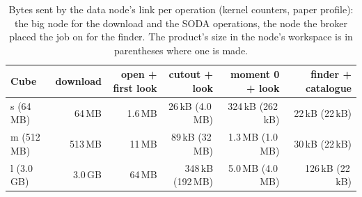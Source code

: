 \begin{table}
\centering
\caption{Bytes sent by the data node's link per operation (kernel counters, paper profile): the big node for the download and the SODA operations, the node the broker placed the job on for the finder. The product's size in the node's workspace is in parentheses where one is made.}
\label{tab:bytes-measured}
\small
\begin{tabular*}{\linewidth}{@{\extracolsep{\fill}}lrrrrr}
\toprule
Cube & download & open + first look & cutout + look & moment 0 + look & finder + catalogue \\
\midrule
s (64\,MB) & 64\,MB & 1.6\,MB & 26\,kB (4.0\,MB) & 324\,kB (262\,kB) & 22\,kB (22\,kB) \\
m (512\,MB) & 513\,MB & 11\,MB & 89\,kB (32\,MB) & 1.3\,MB (1.0\,MB) & 30\,kB (22\,kB) \\
l (3.0\,GB) & 3.0\,GB & 64\,MB & 348\,kB (192\,MB) & 5.0\,MB (4.0\,MB) & 126\,kB (22\,kB) \\
\bottomrule
\end{tabular*}
\end{table}
